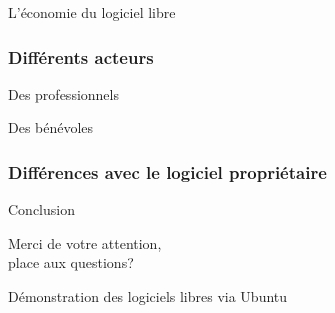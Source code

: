 \documentclass{beamer}
\begin{document}
\begin{frame}
\begin{center}
\Huge{L'économie du logiciel libre}
\end{center}
\end{frame}
\begin{frame}
\frametitle{Différents acteurs}
\begin{block}{Des professionnels}
\begin{itemize}
\end{itemize}
\end{block}

\begin{block}{Des bénévoles}
\begin{itemize}
\end{itemize}
\end{block}
\end{frame}
\begin{frame}
\frametitle{Différences avec le logiciel propriétaire}
\end{frame}

\begin{frame}
\begin{center}
\Huge{Conclusion}
\end{center}
\end{frame}

\begin{frame}
\begin{center}
\Huge{Merci de votre attention, \\place aux questions?}
\end{center}
\end{frame}

\begin{frame}
\begin{center}
\Huge{Démonstration des logiciels libres via Ubuntu}
\end{center}
\end{frame}
\end{document}
